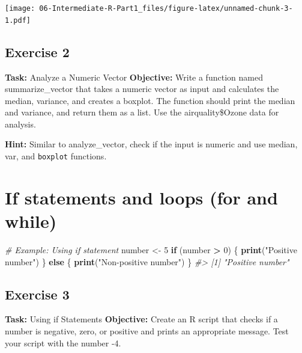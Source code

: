 \documentclass[
]{book}
\newenvironment{Shaded}{\begin{snugshade}}{\end{snugshade}}
\newcommand{\CommentTok}[1]{\textcolor[rgb]{0.56,0.35,0.01}{\textit{#1}}}
\newcommand{\ControlFlowTok}[1]{\textcolor[rgb]{0.13,0.29,0.53}{\textbf{#1}}}
\newcommand{\DecValTok}[1]{\textcolor[rgb]{0.00,0.00,0.81}{#1}}
\newcommand{\FunctionTok}[1]{\textcolor[rgb]{0.13,0.29,0.53}{\textbf{#1}}}
\newcommand{\NormalTok}[1]{#1}
\newcommand{\OtherTok}[1]{\textcolor[rgb]{0.56,0.35,0.01}{#1}}
\newcommand{\SpecialCharTok}[1]{\textcolor[rgb]{0.81,0.36,0.00}{\textbf{#1}}}
\newcommand{\StringTok}[1]{\textcolor[rgb]{0.31,0.60,0.02}{#1}}
\begin{document}
\texttt{[image: 06-Intermediate-R-Part1\_files/figure-latex/unnamed-chunk-3-1.pdf]}

\subsection*{Exercise 2}\label{exercise-2-3}

\textbf{Task:} Analyze a Numeric Vector
\textbf{Objective:} Write a function named summarize\_vector that takes a numeric vector as input and calculates the median, variance, and creates a boxplot. The function should print the median and variance, and return them as a list. Use the airquality\$Ozone data for analysis.

\textbf{Hint:} Similar to analyze\_vector, check if the input is numeric and use median, var, and \texttt{boxplot} functions.

\section*{If statements and loops (for and while)}\label{if-statements-and-loops-for-and-while}

\begin{Shaded}
\begin{Highlighting}[]
\CommentTok{\# Example: Using if statement}
\NormalTok{number }\OtherTok{\textless{}{-}} \DecValTok{5}
\ControlFlowTok{if}\NormalTok{ (number }\SpecialCharTok{\textgreater{}} \DecValTok{0}\NormalTok{) \{}
  \FunctionTok{print}\NormalTok{(}\StringTok{"Positive number"}\NormalTok{)}
\NormalTok{\} }\ControlFlowTok{else}\NormalTok{ \{}
  \FunctionTok{print}\NormalTok{(}\StringTok{"Non{-}positive number"}\NormalTok{)}
\NormalTok{\}}
\CommentTok{\#\textgreater{} [1] "Positive number"}
\end{Highlighting}
\end{Shaded}

\subsection*{Exercise 3}\label{exercise-3-1}

\textbf{Task:} Using if Statements
\textbf{Objective:} Create an R script that checks if a number is negative, zero, or positive and prints an appropriate message. Test your script with the number -4.
\end{document}
